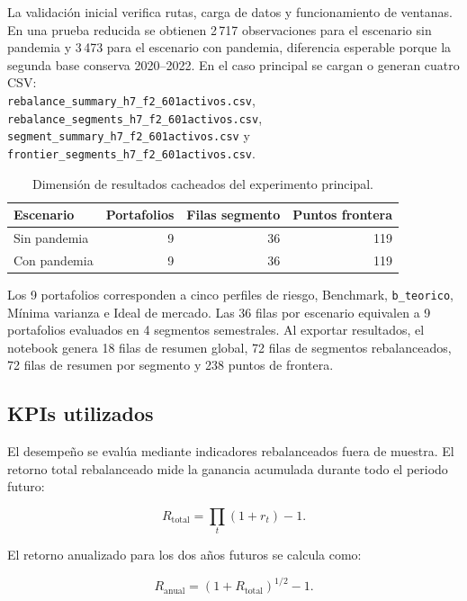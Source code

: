 La validaci\'on inicial verifica rutas, carga de datos y funcionamiento de
ventanas. En una prueba reducida se obtienen 2\,717 observaciones para el
escenario sin pandemia y 3\,473 para el escenario con pandemia, diferencia
esperable porque la segunda base conserva 2020--2022. En el caso principal se
cargan o generan cuatro CSV:\\
\texttt{rebalance\_summary\_h7\_f2\_601activos.csv},\\
\texttt{rebalance\_segments\_h7\_f2\_601activos.csv},\\
\texttt{segment\_summary\_h7\_f2\_601activos.csv} y\\
\texttt{frontier\_segments\_h7\_f2\_601activos.csv}.

\begin{table}[H]
\centering
\caption{Dimensi\'on de resultados cacheados del experimento principal.}
\label{tab:anexo4_cache}
\small
\begin{tabular}{@{}lrrr@{}}
\toprule
Escenario & Portafolios & Filas segmento & Puntos frontera \\
\midrule
Sin pandemia & 9 & 36 & 119 \\
Con pandemia & 9 & 36 & 119 \\
\bottomrule
\end{tabular}
\end{table}

Los 9 portafolios corresponden a cinco perfiles de riesgo, Benchmark,
\texttt{b\_teorico}, M\'inima varianza e Ideal de mercado. Las 36 filas por
escenario equivalen a 9 portafolios evaluados en 4 segmentos semestrales. Al
exportar resultados, el notebook genera 18 filas de resumen global, 72 filas de
segmentos rebalanceados, 72 filas de resumen por segmento y 238 puntos de
frontera.

\subsection*{KPIs utilizados}

El desempe\~no se eval\'ua mediante indicadores rebalanceados fuera de muestra.
El retorno total rebalanceado mide la ganancia acumulada durante todo el periodo
futuro:

\begin{equation}
R_{\text{total}} = \prod_t (1+r_t)-1.
\end{equation}

El retorno anualizado para los dos a\~nos futuros se calcula como:

\begin{equation}
R_{\text{anual}} = (1+R_{\text{total}})^{1/2}-1.
\end{equation}

